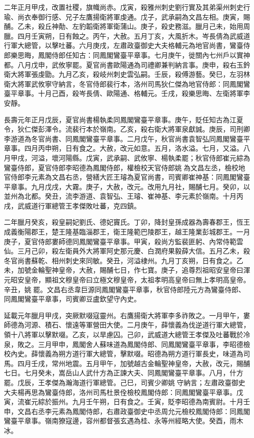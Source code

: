 \begin{pinyinscope}
 二年正月甲戌，改置社稷，旗幟尚赤。戊寅，殺雅州刺史劉行實及其弟渠州刺史行瑜、尚衣奉御行感、兄子左鷹揚衛將軍虔通。戊子，武承嗣為文昌左相。庚寅，賜酺。乙未，殺丘神勣、左豹韜衛將軍衛蒲山。庚子，殺史務滋。臘月己未，始用周臘。四月壬寅朔，日有蝕之。丙午，大赦。五月丁亥，大風折木。岑長倩為武威道行軍大總管，以擊吐蕃。六月庚戌，左肅政臺御史大夫格輔元為地官尚書，鸞臺侍郎樂思晦，鳳閣侍郎任知古：同鳳閣鸞臺平章事。七月庚午，徙關內七州戶以實神都。八月戊申，武攸寧罷。夏官尚書歐陽通為司禮卿兼判納言事。庚申，殺右玉鈐衛大將軍張虔勖。九月乙亥，殺岐州刺史雲弘嗣。壬辰，殺傅游藝。癸巳，左羽林衛大將軍武攸寧守納言，冬官侍郎裴行本，洛州司馬狄仁傑為地官侍郎：同鳳閣鸞臺平章事。十月己酉，殺岑長倩、歐陽通、格輔元。壬戌，殺樂思晦、左衛將軍李安靜。



 長壽元年正月戊辰，夏官尚書楊執柔同鳳閣鸞臺平章事。庚午，貶任知古為江夏令，狄仁傑彭澤令。流裴行本於嶺南。乙亥，殺右衛大將軍泉獻誠。庚辰，司刑卿李游道為冬官尚書、同鳳閣鸞臺平章事。二月戊午，秋官尚書袁智弘同鳳閣鸞臺平章事。四月丙申朔，日有食之。大赦，改元如意。五月，洛水溢。七月，又溢。八月甲戌，河溢，壞河陽縣。戊寅，武承嗣、武攸寧、楊執柔罷；秋官侍郎崔元綜為鸞臺侍郎，夏官侍郎李昭德為鳳閣侍郎，權檢校天官侍郎姚為文昌左丞，檢校地官侍郎李元素為文昌右丞，營繕大匠王璿為夏官尚書，司賓卿崔神基：同鳳閣鸞臺平章事。九月戊戌，大霧。庚子，大赦，改元。改用九月社，賜酺七月。癸卯，以並州為北都。癸丑，流李游道、袁智弘、王璿、崔神基、李元素於嶺南。十月丙戌，武威道行軍總管王孝傑敗吐蕃，克四鎮。



 二年臘月癸亥，殺皇嗣妃劉氏、德妃竇氏。丁卯，降封皇孫成器為壽春郡王，恆王成義衡陽郡王，楚王隆基臨淄郡王，衛王隆範巴陵郡王，越王隆業彭城郡王。一月庚子，夏官侍郎婁師德同鳳閣鸞臺平章事。甲寅，殺尚方監裴匪躬、內常侍範雲仙。三月己卯，殺左衛員外大將軍阿史那元慶、白潤府果毅薛大信。五月乙未，殺冬官尚書蘇乾、相州刺史來同敏。癸丑，河溢棣州。九月丁亥朔，日有食之。乙未，加號金輪聖神皇帝，大赦，賜酺七日，作七寶。庚子，追尊烈祖昭安皇帝曰渾元昭安皇帝，顯祖文穆皇帝曰立極文穆皇帝，太祖孝明高皇帝曰無上孝明高皇帝。辛丑，姚罷。文昌右丞韋巨源同鳳閣鸞臺平章事，秋官侍郎陸元方為鸞臺侍郎、同鳳閣鸞臺平章事，司賓卿豆盧欽望守內史。



 延載元年臘月甲戌，突厥默啜寇靈州。右鷹揚衛大將軍李多祚敗之。一月甲午，婁師德為河源、積石、懷遠等軍營田大使。二月庚午，薛懷義為伐逆道行軍大總管，領十八將軍以擊默啜。乙亥，以旱慮囚。己卯，武威道大總管王孝傑及吐蕃戰於冷泉，敗之。三月甲申，鳳閣舍人蘇味道為鳳閣侍郎、同鳳閣鸞臺平章事，李昭德檢校內史。薛懷義為朔方道行軍大總管，擊默啜。昭德為朔方道行軍長史，味道為司馬。四月壬戌，常州地震。五月甲午，加號越古金輪聖神皇帝，大赦，改元，賜酺七日。七月癸未，嵩岳山人武什方為正諫大夫、同鳳閣鸞臺平章事。八月，什方罷。戊辰，王孝傑為瀚海道行軍總管。己巳，司賓少卿姚守納言；左肅政臺御史大夫楊再思為鸞臺侍郎，洛州司馬杜景佺檢校鳳閣侍郎：同鳳閣鸞臺平章事。戊寅，流崔元綜於振州。九月壬午朔，日有食之。壬寅，貶李昭德為南賓尉。十月壬申，文昌右丞李元素為鳳閣侍郎，右肅政臺御史中丞周允元檢校鳳閣侍郎：同鳳閣鸞臺平章事。嶺南獠寇邊，容州都督張玄遇為桂、永等州經略大使。癸酉，雨木冰。




\end{pinyinscope}
